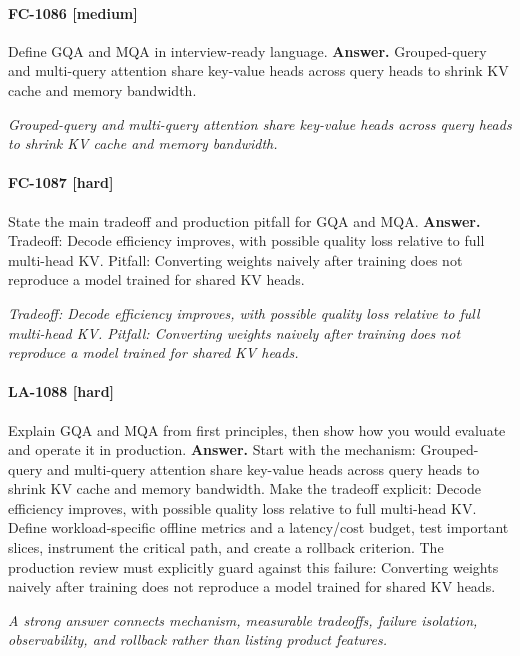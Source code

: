 \paragraph{FC-1086 [medium]} Define GQA and MQA in interview-ready language.
\noindent\textbf{Answer.} Grouped-query and multi-query attention share key-value heads across query heads to shrink KV cache and memory bandwidth.
\par\textit{Grouped-query and multi-query attention share key-value heads across query heads to shrink KV cache and memory bandwidth.}
\paragraph{FC-1087 [hard]} State the main tradeoff and production pitfall for GQA and MQA.
\noindent\textbf{Answer.} Tradeoff: Decode efficiency improves, with possible quality loss relative to full multi-head KV. Pitfall: Converting weights naively after training does not reproduce a model trained for shared KV heads.
\par\textit{Tradeoff: Decode efficiency improves, with possible quality loss relative to full multi-head KV. Pitfall: Converting weights naively after training does not reproduce a model trained for shared KV heads.}
\paragraph{LA-1088 [hard]} Explain GQA and MQA from first principles, then show how you would evaluate and operate it in production.
\noindent\textbf{Answer.} Start with the mechanism: Grouped-query and multi-query attention share key-value heads across query heads to shrink KV cache and memory bandwidth. Make the tradeoff explicit: Decode efficiency improves, with possible quality loss relative to full multi-head KV. Define workload-specific offline metrics and a latency/cost budget, test important slices, instrument the critical path, and create a rollback criterion. The production review must explicitly guard against this failure: Converting weights naively after training does not reproduce a model trained for shared KV heads.
\par\textit{A strong answer connects mechanism, measurable tradeoffs, failure isolation, observability, and rollback rather than listing product features.}
